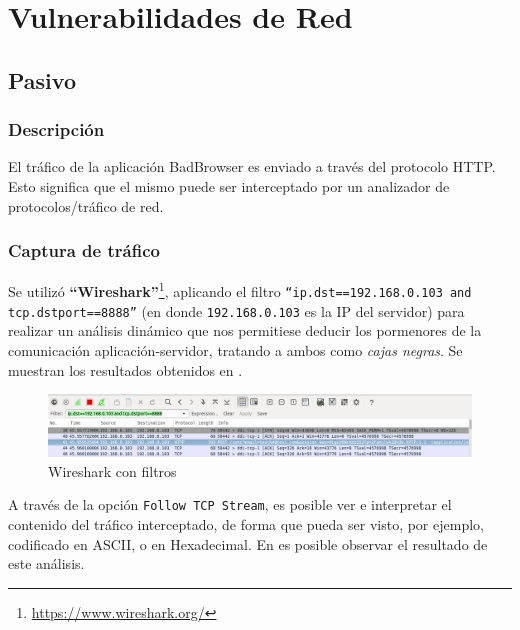 \documentclass[11pt, a4paper, twoside]{article}
\begin{document}
%
%
\clearpage
{}
\section{Vulnerabilidades de Red}
%
%
\subsection{Pasivo}
\subsubsection{Descripción}
El tráfico de la aplicación BadBrowser es enviado a través del protocolo HTTP. Esto significa que el mismo puede ser interceptado por un analizador de protocolos/tráfico de red. 

\subsubsection{Captura de tráfico}
Se utilizó \textbf{``Wireshark''}\footnote{\url{https://www.wireshark.org/}}, aplicando el filtro \texttt{``ip.dst==192.168.0.103 and tcp.dstport==8888''} (en donde \texttt{192.168.0.103} es la IP del servidor) para realizar un análisis dinámico que nos permitiese deducir los pormenores de la comunicación aplicación-servidor, tratando a ambos como \emph{cajas negras}. Se muestran los resultados obtenidos en .

\begin{center}
\begin{figure}[H]
\includegraphics[width=\textwidth]{wireshark-filtro.png}
\caption{Wireshark con filtros}
\label{fig:wireshark-filtro}
\end{figure}
\end{center}

A través de la opción \texttt{Follow TCP Stream}, es posible ver e interpretar el contenido del tráfico interceptado, de forma que pueda ser visto, por ejemplo, codificado en ASCII, o en Hexadecimal. En  es posible observar el resultado de este análisis.
\end{document}
